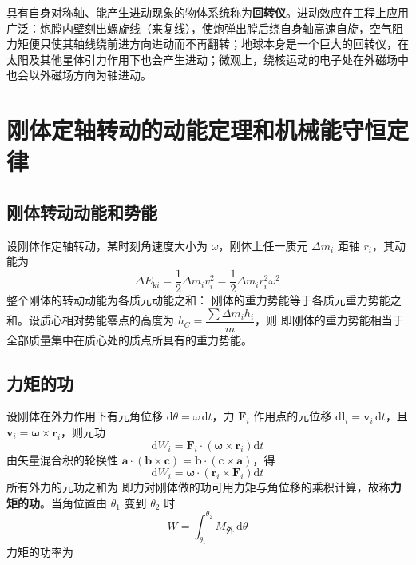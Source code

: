 
    具有自身对称轴、能产生进动现象的物体系统称为\textbf{回转仪}。进动效应在工程上应用广泛：炮膛内壁刻出螺旋线（来复线），使炮弹出膛后绕自身轴高速自旋，空气阻力矩便只使其轴线绕前进方向进动而不再翻转；地球本身是一个巨大的回转仪，在太阳及其他星体引力作用下也会产生进动；微观上，绕核运动的电子处在外磁场中也会以外磁场方向为轴进动。

\section{刚体定轴转动的动能定理和机械能守恒定律}
    \subsection{刚体转动动能和势能}
    设刚体作定轴转动，某时刻角速度大小为 $\omega$，刚体上任一质元 $\Delta m_{i}$ 距轴 $r_{i}$，其动能为
    \[
    \Delta E_{\mathrm{k}i}=\frac{1}{2}\Delta m_{i}v_{i}^{2}=\frac{1}{2}\Delta m_{i}r_{i}^{2}\omega^{2}
    \]
    整个刚体的转动动能为各质元动能之和：
    刚体的重力势能等于各质元重力势能之和。设质心相对势能零点的高度为
    $h_{C}=\dfrac{\sum\Delta m_{i}h_{i}}{m}$，则
    即刚体的重力势能相当于全部质量集中在质心处的质点所具有的重力势能。

    \subsection{力矩的功}
    设刚体在外力作用下有元角位移 $\mathrm{d}\theta=\omega\,\mathrm{d}t$，力 $\boldsymbol{F}_{i}$ 作用点的元位移 $\mathrm{d}\boldsymbol{l}_{i}=\boldsymbol{v}_{i}\,\mathrm{d}t$，且 $\boldsymbol{v}_{i}=\boldsymbol{\omega}\times\boldsymbol{r}_{i}$，则元功
    \[
    \mathrm{d}W_{i}=\boldsymbol{F}_{i}\cdot\left(\boldsymbol{\omega}\times\boldsymbol{r}_{i}\right)\mathrm{d}t
    \]
    由矢量混合积的轮换性 $\boldsymbol{a}\cdot(\boldsymbol{b}\times\boldsymbol{c})=\boldsymbol{b}\cdot(\boldsymbol{c}\times\boldsymbol{a})$，得
    \[
    \mathrm{d}W_{i}=\boldsymbol{\omega}\cdot\left(\boldsymbol{r}_{i}\times\boldsymbol{F}_{i}\right)\mathrm{d}t
    \]
    所有外力的元功之和为
    即力对刚体做的功可用力矩与角位移的乘积计算，故称\textbf{力矩的功}。当角位置由 $\theta_{1}$ 变到 $\theta_{2}$ 时
    \[
    W=\int_{\theta_{1}}^{\theta_{2}}M_{\text{外}}\,\mathrm{d}\theta
    \]
    力矩的功率为

